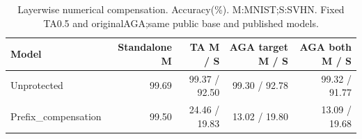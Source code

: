 \begin{table}[t]\centering
\caption{Layerwise numerical compensation. Accuracy(\%). M:MNIST;S:SVHN. Fixed TA0.5 and originalAGA;same public base and published models.}\label{tab:numerical}
\begin{tabular}{lrrrr}\toprule
Model & Standalone M & TA M / S & AGA target M / S & AGA both M / S \\
\midrule
Unprotected & 99.69 & 99.37 / 92.50 & 99.30 / 92.78 & 99.32 / 91.77 \\
Prefix\_compensation & 99.50 & 24.46 / 19.83 & 13.02 / 19.80 & 13.09 / 19.68 \\
\bottomrule\end{tabular}
\end{table}
